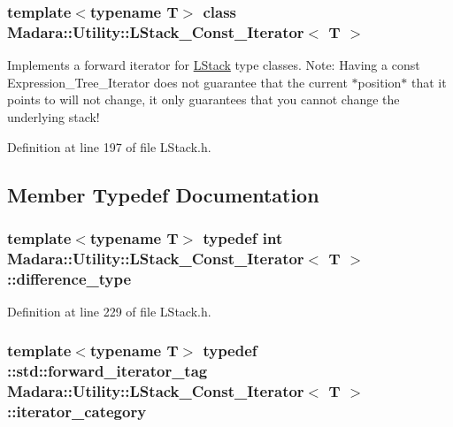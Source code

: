 \subsubsection*{template$<$typename T$>$ class Madara::Utility::LStack\_\-Const\_\-Iterator$<$ T $>$}

Implements a forward iterator for \hyperlink{classMadara_1_1Utility_1_1LStack}{LStack} type classes. Note: Having a const Expression\_\-Tree\_\-Iterator does not guarantee that the current $\ast$position$\ast$ that it points to will not change, it only guarantees that you cannot change the underlying stack! 

Definition at line 197 of file LStack.h.



\subsection{Member Typedef Documentation}
\hypertarget{classMadara_1_1Utility_1_1LStack__Const__Iterator_ad90bc09c42a788b48b2d46591c3ca86f}{
\subsubsection[{difference\_\-type}]{\setlength{\rightskip}{0pt plus 5cm}template$<$typename T$>$ typedef int {\bf Madara::Utility::LStack\_\-Const\_\-Iterator}$<$ T $>$::{\bf difference\_\-type}}}
\label{de/de3/classMadara_1_1Utility_1_1LStack__Const__Iterator_ad90bc09c42a788b48b2d46591c3ca86f}


Definition at line 229 of file LStack.h.

\hypertarget{classMadara_1_1Utility_1_1LStack__Const__Iterator_a2577f2094e133444dad9302e05f97767}{
\subsubsection[{iterator\_\-category}]{\setlength{\rightskip}{0pt plus 5cm}template$<$typename T$>$ typedef ::std::forward\_\-iterator\_\-tag {\bf Madara::Utility::LStack\_\-Const\_\-Iterator}$<$ T $>$::{\bf iterator\_\-category}}}
\label{de/de3/classMadara_1_1Utility_1_1LStack__Const__Iterator_a2577f2094e133444dad9302e05f97767}


